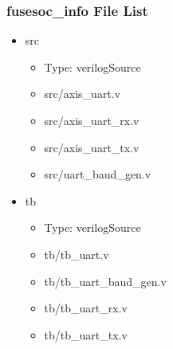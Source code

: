 \subsubsection{fusesoc\_info File List}
\begin{itemize}
\item src
	\begin{itemize}
	\item[$\space$] Type: verilogSource
	\item src/axis\_uart.v
	\item src/axis\_uart\_rx.v
	\item src/axis\_uart\_tx.v
	\item src/uart\_baud\_gen.v
	\end{itemize}
\item tb
	\begin{itemize}
	\item[$\space$] Type: verilogSource
	\item tb/tb\_uart.v
	\item tb/tb\_uart\_baud\_gen.v
	\item tb/tb\_uart\_rx.v
	\item tb/tb\_uart\_tx.v
	\end{itemize}
\end{itemize}
